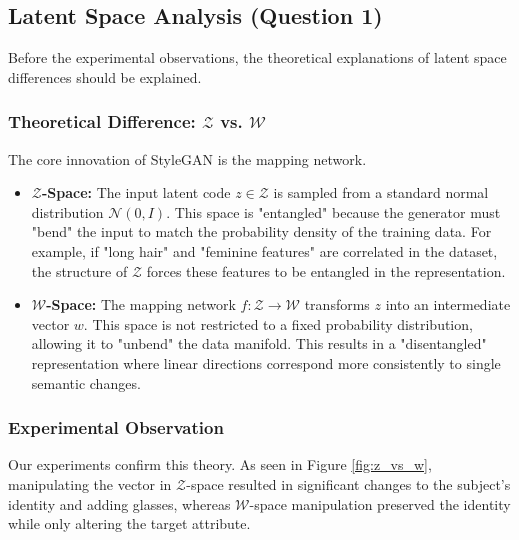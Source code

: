 \documentclass[12pt, a4paper]{article}
\begin{document}
\subsection{Latent Space Analysis (Question 1)}
Before the experimental observations, the theoretical explanations of latent space differences should be explained.
\subsubsection{Theoretical Difference: $\mathcal{Z}$ vs. $\mathcal{W}$}
The core innovation of StyleGAN is the mapping network. 
\begin{itemize}
    \item \textbf{$\mathcal{Z}$-Space:} The input latent code $z \in \mathcal{Z}$ is sampled from a standard normal distribution $\mathcal{N}(0, I)$. This space is "entangled" because the generator must "bend" the input to match the probability density of the training data. For example, if "long hair" and "feminine features" are correlated in the dataset, the structure of $\mathcal{Z}$ forces these features to be entangled in the representation.
    \item \textbf{$\mathcal{W}$-Space:} The mapping network $f: \mathcal{Z} \to \mathcal{W}$ transforms $z$ into an intermediate vector $w$. This space is not restricted to a fixed probability distribution, allowing it to "unbend" the data manifold. This results in a "disentangled" representation where linear directions correspond more consistently to single semantic changes.
\end{itemize}

\subsubsection{Experimental Observation}
Our experiments confirm this theory. As seen in Figure \ref{fig:z_vs_w}, manipulating the vector in $\mathcal{Z}$-space resulted in significant changes to the subject's identity and adding glasses, whereas $\mathcal{W}$-space manipulation preserved the identity while only altering the target attribute.
\end{document}
